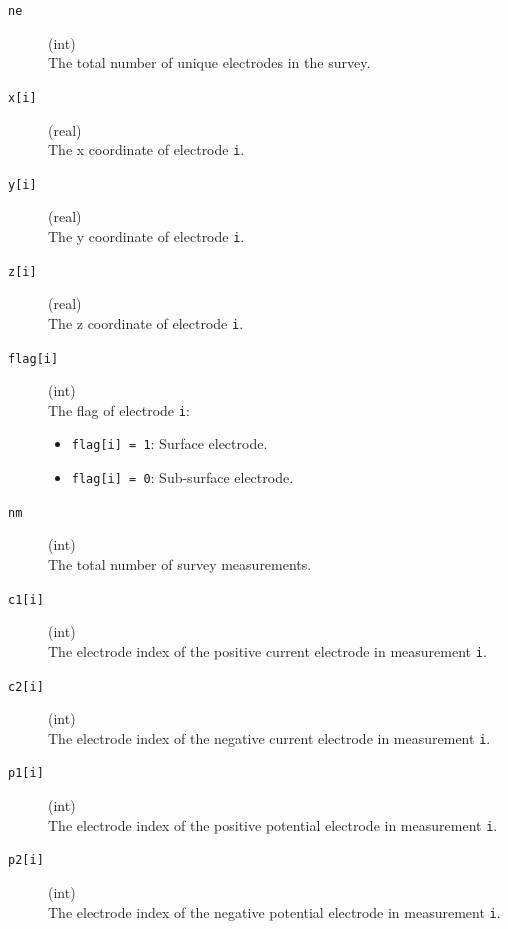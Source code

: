 \documentclass[a4paper,12pt]{article}
\begin{document}
\begin{description}
    \item[\texttt{ne}] (int)\hfill \\
    The total number of unique electrodes in the survey.
    
    \item[\texttt{x[i]}] (real)\hfill \\
    The x coordinate of electrode \texttt{i}.

    \item[\texttt{y[i]}] (real)\hfill \\
    The y coordinate of electrode \texttt{i}.

    \item[\texttt{z[i]}] (real)\hfill \\
    The z coordinate of electrode \texttt{i}.

    \item[\texttt{flag[i]}] (int)\hfill \\
    The flag of electrode \texttt{i}:
    \begin{itemize}
        \item \texttt{flag[i] = 1}: Surface electrode.
        \item \texttt{flag[i] = 0}: Sub-surface electrode.
    \end{itemize}
    
    \item[\texttt{nm}] (int)\hfill \\
    The total number of survey measurements.

    \item[\texttt{c1[i]}] (int)\hfill \\
    The electrode index of the positive current electrode in measurement \texttt{i}.

    \item[\texttt{c2[i]}] (int)\hfill \\
    The electrode index of the negative current electrode in measurement \texttt{i}.

    \item[\texttt{p1[i]}] (int)\hfill \\
    The electrode index of the positive potential electrode in measurement \texttt{i}.

    \item[\texttt{p2[i]}] (int)\hfill \\
    The electrode index of the negative potential electrode in measurement \texttt{i}.


\end{description}
\end{document}
